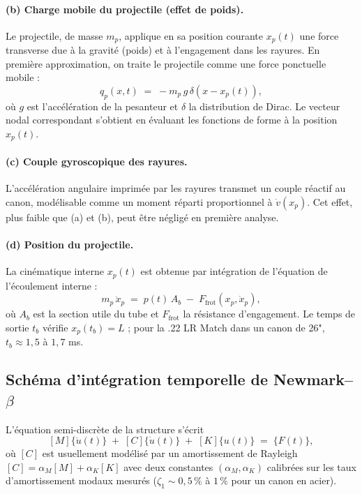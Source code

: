 \documentclass[12pt,a4paper]{article}
\begin{document}
	\paragraph{(b) Charge mobile du projectile (effet de poids).} Le projectile, de masse $m_p$, applique en sa position courante $x_p(t)$ une force transverse due à la gravité (poids) et à l'engagement dans les rayures. En première approximation, on traite le projectile comme une force ponctuelle mobile :
	\begin{equation}
		q_p(x,t) \;=\; -m_p\,g\,\delta(x - x_p(t)),
	\end{equation}
	où $g$ est l'accélération de la pesanteur et $\delta$ la distribution de Dirac. Le vecteur nodal correspondant s'obtient en évaluant les fonctions de forme à la position $x_p(t)$.

	\paragraph{(c) Couple gyroscopique des rayures.} L'accélération angulaire imprimée par les rayures transmet un couple réactif au canon, modélisable comme un moment réparti proportionnel à $\dot v(x_p)$. Cet effet, plus faible que (a) et (b), peut être négligé en première analyse.

	\paragraph{(d) Position du projectile.} La cinématique interne $x_p(t)$ est obtenue par intégration de l'équation de l'écoulement interne :
	\begin{equation}
		m_p\,\ddot x_p \;=\; p(t)\, A_b \;-\; F_\text{frot}(x_p, \dot x_p),
	\end{equation}
	où $A_b$ est la section utile du tube et $F_\text{frot}$ la résistance d'engagement. Le temps de sortie $t_b$ vérifie $x_p(t_b) = L$ ; pour la .22 LR Match dans un canon de 26", $t_b \approx 1{,}5$ à $1{,}7$ ms.

	\subsection{Schéma d'intégration temporelle de Newmark--$\beta$}

	L'équation semi-discrète de la structure s'écrit
	\begin{equation}
		\label{eq:dynsemi}
		[M]\{\ddot u(t)\} \;+\; [C]\{\dot u(t)\} \;+\; [K]\{u(t)\} \;=\; \{F(t)\},
	\end{equation}
	où $[C]$ est usuellement modélisé par un amortissement de Rayleigh $[C] = \alpha_M [M] + \alpha_K [K]$ avec deux constantes $(\alpha_M,\alpha_K)$ calibrées sur les taux d'amortissement modaux mesurés ($\zeta_1 \sim 0{,}5\,\%$ à $1\,\%$ pour un canon en acier).
\end{document}
